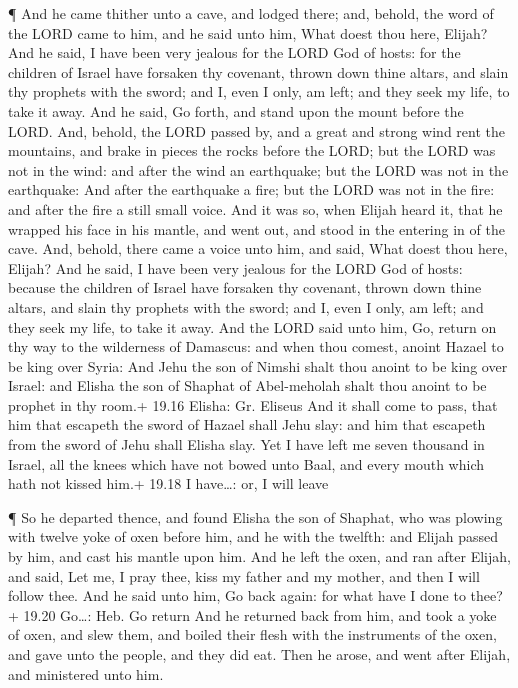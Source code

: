  ¶ And he came thither unto a cave, and lodged there; and,
behold, the word of the LORD came to him, and he said unto him, What
doest thou here, Elijah?  And he said, I have been very
jealous for the LORD God of hosts: for the children of Israel have
forsaken thy covenant, thrown down thine altars, and slain thy prophets
with the sword; and I, even I only, am left; and they seek my life, to
take it away.  And he said, Go forth, and stand upon the
mount before the LORD. And, behold, the LORD passed by, and a great and
strong wind rent the mountains, and brake in pieces the rocks before the
LORD; but the LORD was not in the wind: and after the wind an
earthquake; but the LORD was not in the earthquake:  And
after the earthquake a fire; but the LORD was not in the fire: and after
the fire a still small voice.  And it was so, when Elijah
heard it, that he wrapped his face in his mantle, and went out, and
stood in the entering in of the cave. And, behold, there came a voice
unto him, and said, What doest thou here, Elijah?  And he
said, I have been very jealous for the LORD God of hosts: because the
children of Israel have forsaken thy covenant, thrown down thine altars,
and slain thy prophets with the sword; and I, even I only, am left; and
they seek my life, to take it away.  And the LORD said unto
him, Go, return on thy way to the wilderness of Damascus: and when thou
comest, anoint Hazael to be king over Syria:  And Jehu the
son of Nimshi shalt thou anoint to be king over Israel: and Elisha the
son of Shaphat of Abel-meholah shalt thou anoint to be prophet in thy
room.+ 19.16 Elisha: Gr. Eliseus  And it shall come to
pass, that him that escapeth the sword of Hazael shall Jehu slay: and
him that escapeth from the sword of Jehu shall Elisha slay.
 Yet I have left me seven thousand in Israel, all the knees
which have not bowed unto Baal, and every mouth which hath not kissed
him.+ 19.18 I have\ldots: or, I will leave

 ¶ So he departed thence, and found Elisha the son of
Shaphat, who was plowing with twelve yoke of oxen before him, and he
with the twelfth: and Elijah passed by him, and cast his mantle upon
him.  And he left the oxen, and ran after Elijah, and said,
Let me, I pray thee, kiss my father and my mother, and then I will
follow thee. And he said unto him, Go back again: for what have I done
to thee?+ 19.20 Go\ldots: Heb. Go return  And he returned
back from him, and took a yoke of oxen, and slew them, and boiled their
flesh with the instruments of the oxen, and gave unto the people, and
they did eat. Then he arose, and went after Elijah, and ministered unto
him.

